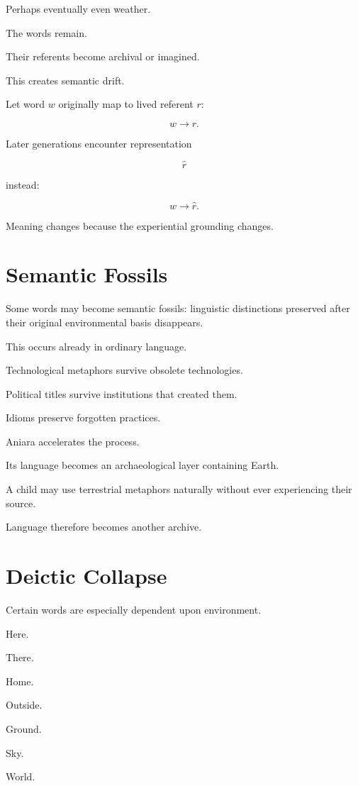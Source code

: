 \documentclass[11pt,oneside]{book}
\theoremstyle{definition}
\theoremstyle{remark}
\begin{document}
Perhaps eventually even weather.

The words remain.

Their referents become archival or imagined.

This creates semantic drift.

Let word \(w\) originally map to lived referent \(r\):

\[
w\rightarrow r.
\]

Later generations encounter representation

\[
\hat r
\]

instead:

\[
w\rightarrow\hat r.
\]

Meaning changes because the experiential grounding changes.

\section{Semantic Fossils}

Some words may become semantic fossils: linguistic distinctions preserved after their original environmental basis disappears.

This occurs already in ordinary language.

Technological metaphors survive obsolete technologies.

Political titles survive institutions that created them.

Idioms preserve forgotten practices.

Aniara accelerates the process.

Its language becomes an archaeological layer containing Earth.

A child may use terrestrial metaphors naturally without ever experiencing their source.

Language therefore becomes another archive.

\section{Deictic Collapse}

Certain words are especially dependent upon environment.

Here.

There.

Home.

Outside.

Ground.

Sky.

World.
\end{document}
